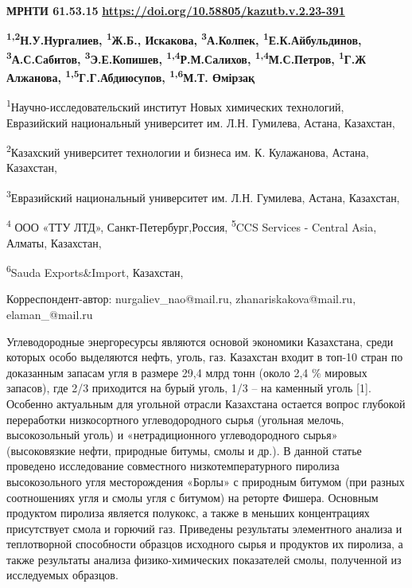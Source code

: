 \newpage
{\bfseries МРНТИ 61.53.15}
\hfill {\bfseries \href{https://doi.org/10.58805/kazutb.v.2.23-391}{https://doi.org/10.58805/kazutb.v.2.23-391}}


\begin{center}
{\bfseries \textsuperscript{1,2}Н.У.Нургалиев\envelope, \textsuperscript{1}Ж.Б., Искакова\envelope, \textsuperscript{3}А.Колпек, \textsuperscript{1}Е.К.Айбульдинов\envelope, \textsuperscript{3}А.С.Сабитов, \textsuperscript{3}Э.Е.Копишев, \textsuperscript{1,4}Р.М.Салихов, \textsuperscript{1,4}М.С.Петров, \textsuperscript{1}Г.Ж Алжанова, \textsuperscript{1,5}Г.Г.Абдиюсупов, \textsuperscript{1,6}М.Т. Өмірзақ}

\textsuperscript{1}Научно-исследовательский институт Новых химических
технологий, Евразийский национальный университет им. Л.Н. Гумилева,
Астана, Казахстан,

\textsuperscript{2}Казахский университет технологии и бизнеса им. К.
Кулажанова, Астана, Казахстан,

\textsuperscript{3}Евразийский национальный университет им. Л.Н.
Гумилева, Астана, Казахстан,

\textsuperscript{4} ООО «ТТУ ЛТД», Санкт-Петербург,Россия,
\textsuperscript{5}CCS Services - Central Asia, Алматы, Казахстан,

\textsuperscript{6}Sauda Exports\&Import, Казахстан,

\envelope Корреспондент-автор: nurgaliev\_nao@mail.ru, zhanariskakova@mail.ru,
elaman\_@mail.ru
\end{center}

Углеводородные энергоре­сурсы являются основой экономики Казахстана,
среди которых особо выделяются нефть, уголь, газ. Казахстан входит в
топ-10 стран по доказанным запасам угля в размере 29,4 млрд тонн (около
2,4 \% мировых запасов), где 2/3 приходится на бурый уголь, 1/3 -- на
каменный уголь {[}1{]}. Особенно актуальным для угольной отрасли
Казахстана остается вопрос глубокой переработки низкосортного
углеводородного сырья (угольная мелочь, высокозольный уголь) и
«нетрадиционного углеводородного сырья» (высоковязкие нефти, природные
битумы, смолы и др.). В данной статье проведено исследование совместного
низкотемпературного пиролиза высокозольного угля месторождения «Борлы» с
природным битумом (при разных соотношениях угля и смолы угля с битумом)
на реторте Фишера. Основным продуктом пиролиза является полукокс, а
также в меньших концентрациях присутствует смола и горючий газ.
Приведены результаты элементного анализа и теплотворной способности
образцов исходного сырья и продуктов их пиролиза, а также результаты
анализа физико-химических показателей смолы, полученной из исследуемых
образцов.

